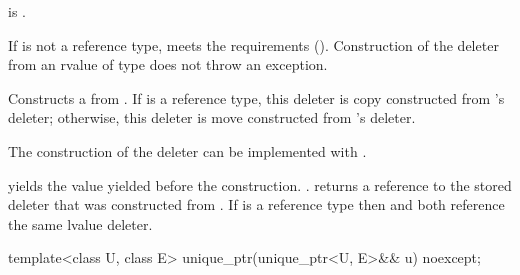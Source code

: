 \begin{itemdescr}
\pnum
\constraints
{} is .

\pnum
\expects
If  is not a reference type,
 meets the 
requirements ().
Construction
of the deleter from an rvalue of type  does not
throw an exception.

\pnum
\effects
Constructs a  from
. If  is a reference type, this
deleter is copy constructed from 's deleter; otherwise, this
deleter is move constructed from 's deleter.
\begin{note}
The
construction of the deleter can be implemented with .
\end{note}

\pnum
\ensures
{} yields the value 
yielded before the construction. .
 returns a reference
to the stored deleter that was constructed from
. If  is a reference type then
 and  both reference
the same lvalue deleter.
\end{itemdescr}

%
\begin{itemdecl}
template<class U, class E> unique_ptr(unique_ptr<U, E>&& u) noexcept;
\end{itemdecl}

